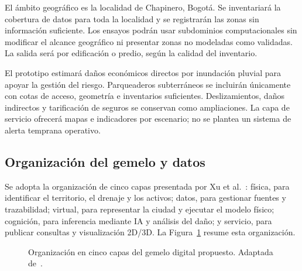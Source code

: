 \documentclass[journal]{IEEEtran}
\begin{document}
El ámbito geográfico es la localidad de Chapinero, Bogotá. Se inventariará la cobertura de datos para toda la localidad y se registrarán las zonas sin información suficiente. Los ensayos podrán usar subdominios computacionales sin modificar el alcance geográfico ni presentar zonas no modeladas como validadas. La salida será por edificación o predio, según la calidad del inventario.

El prototipo estimará daños económicos directos por inundación pluvial para apoyar la gestión del riesgo. Parqueaderos subterráneos se incluirán únicamente con cotas de acceso, geometría e inventarios suficientes. Deslizamientos, daños indirectos y tarificación de seguros se conservan como ampliaciones. La capa de servicio ofrecerá mapas e indicadores por escenario; no se plantea un sistema de alerta temprana operativo.

\subsection{Organización del gemelo y datos}

Se adopta la organización de cinco capas presentada por Xu et al.~\cite{xu2024}: física, para identificar el territorio, el drenaje y los activos; datos, para gestionar fuentes y trazabilidad; virtual, para representar la ciudad y ejecutar el modelo físico; cognición, para inferencia mediante IA y análisis del daño; y servicio, para publicar consultas y visualización 2D/3D. La Figura~\ref{fig:arquitectura} resume esta organización.

\begin{figure}[!t]
\centering
{}
\caption{Organización en cinco capas del gemelo digital propuesto. Adaptada de~\cite{xu2024}.}
\label{fig:arquitectura}
\end{figure}
\end{document}
